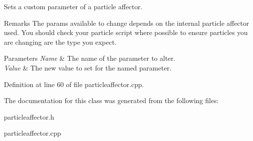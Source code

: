 Sets a custom parameter of a particle affector. 

\begin{DoxyRemark}{Remarks}
The params available to change depends on the internal particle affector used. You should check your particle script where possible to ensure particles you are changing are the type you expect. 
\end{DoxyRemark}

\begin{DoxyParams}{Parameters}
{\em Name} & The name of the parameter to alter. \\
\hline
{\em Value} & The new value to set for the named parameter. \\
\hline
\end{DoxyParams}


Definition at line 60 of file particleaffector.cpp.



The documentation for this class was generated from the following files:\begin{DoxyCompactItemize}
\item 
particleaffector.h\item 
particleaffector.cpp\end{DoxyCompactItemize}

